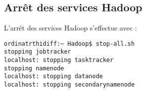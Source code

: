 \subsection{Arrêt des services Hadoop}

\par L'arrêt des services Hadoop s'effectue avec :

\begin{verbatim}
ordinatrthidiff:~ Hadoop$ stop-all.sh
stopping jobtracker
localhost: stopping tasktracker
stopping namenode
localhost: stopping datanode
localhost: stopping secondarynamenode
\end{verbatim}

